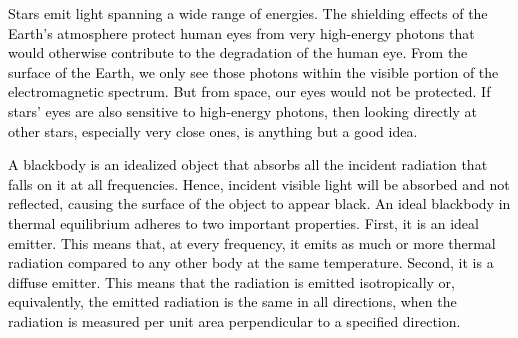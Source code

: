 \documentclass[main.tex]{subfiles}
\begin{document}
\begin{tcolorbox}[sharp corners, colback=red!30, colframe=red!80!blue, title=Box \refstepcounter{educhap1}\label{boxchap1:se}\ref{boxchap1:se} -- Stellar Emission]
\par \textcolor{black} {Stars emit light spanning a wide range of energies.  The shielding effects of the Earth's atmosphere protect human eyes from very high-energy photons that would otherwise contribute to the degradation of the human eye.  From the surface of the Earth, we only see those photons within the visible portion of the electromagnetic spectrum.  But from space, our eyes would not be protected.  If stars' eyes are also sensitive to high-energy photons, then looking directly at other stars, especially very close ones, is anything but a good idea.}
\end{tcolorbox}

\begin{tcolorbox}[sharp corners, colback=blue!30, colframe=blue!80!blue, title=Box \refstepcounter{educhap1}\label{boxchap1:bb}\ref{boxchap1:bb} -- Blackbody]
\par \textcolor{black} {A blackbody is an idealized object that absorbs all the incident radiation that falls on it at all frequencies.  Hence, incident visible light will be absorbed and not reflected, causing the surface of the object to appear black.  An ideal blackbody in thermal equilibrium adheres to two important properties.  First, it is an ideal emitter.  This means that, at every frequency, it emits as much or more thermal radiation compared to any other body at the same temperature.  Second, it is a diffuse emitter.  This means that the radiation is emitted isotropically or, equivalently, the emitted radiation is the same in all directions, when the radiation is measured per unit area perpendicular to a specified direction.}
\end{tcolorbox}
\end{document}
